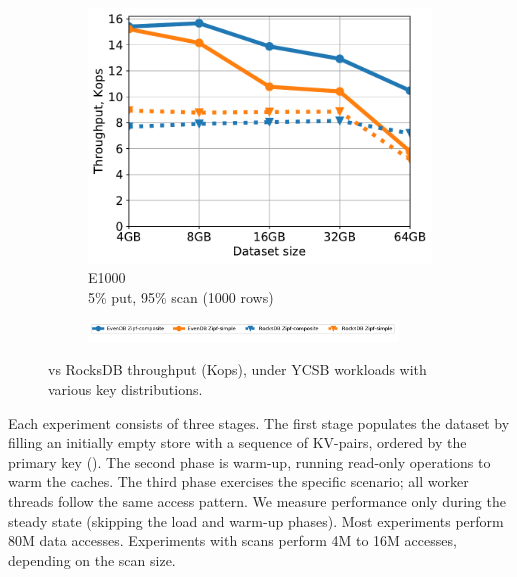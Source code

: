 \begin{figure}[tb]
\begin{subfigure}{0.33\linewidth}
\includegraphics[width=\textwidth]{figs/Workload_E+_line.pdf}
\caption{E1000 \\5\% put, 95\% scan (1000 rows)}
\label{fig:throughput:e1000}
\end{subfigure}
\begin{subfigure}{\linewidth}
\centerline{
\includegraphics[width=0.9\textwidth]{figs/legend.pdf}
\vspace{-5mm}
}
\end{subfigure}
\caption{
{\sys\/ vs RocksDB throughput (Kops), under YCSB workloads with various key distributions.}
}
\label{fig:throughput}
\end{figure}

Each experiment consists of three stages. The first stage populates the dataset by filling an initially 
empty store with a sequence of KV-pairs, ordered by the primary key (). 
The second phase is warm-up, running read-only operations to warm the caches. The third phase 
exercises the specific scenario; all worker threads  follow the same access pattern. 
We measure performance only during the steady state (skipping the load and warm-up phases). Most experiments  
perform 80M data accesses. Experiments with scans perform 4M to 16M accesses, depending on the scan size. 

